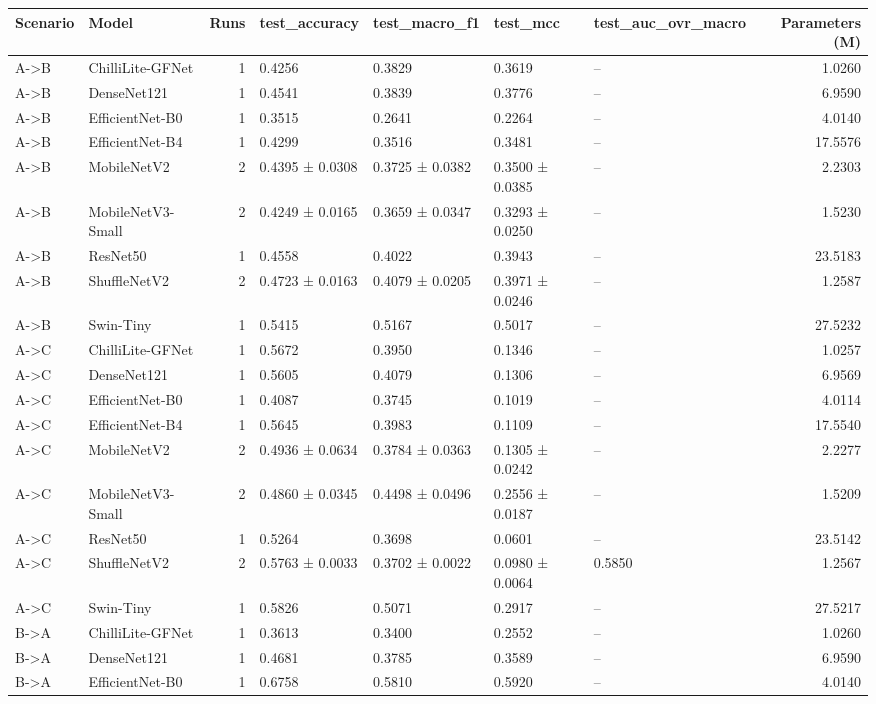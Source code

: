 \begin{tabular}{llrllllr}
\toprule
Scenario & Model & Runs & test\_accuracy & test\_macro\_f1 & test\_mcc & test\_auc\_ovr\_macro & Parameters (M) \\
\midrule
A->B & ChilliLite-GFNet & 1 & 0.4256 & 0.3829 & 0.3619 & -- & 1.0260 \\
A->B & DenseNet121 & 1 & 0.4541 & 0.3839 & 0.3776 & -- & 6.9590 \\
A->B & EfficientNet-B0 & 1 & 0.3515 & 0.2641 & 0.2264 & -- & 4.0140 \\
A->B & EfficientNet-B4 & 1 & 0.4299 & 0.3516 & 0.3481 & -- & 17.5576 \\
A->B & MobileNetV2 & 2 & 0.4395 ± 0.0308 & 0.3725 ± 0.0382 & 0.3500 ± 0.0385 & -- & 2.2303 \\
A->B & MobileNetV3-Small & 2 & 0.4249 ± 0.0165 & 0.3659 ± 0.0347 & 0.3293 ± 0.0250 & -- & 1.5230 \\
A->B & ResNet50 & 1 & 0.4558 & 0.4022 & 0.3943 & -- & 23.5183 \\
A->B & ShuffleNetV2 & 2 & 0.4723 ± 0.0163 & 0.4079 ± 0.0205 & 0.3971 ± 0.0246 & -- & 1.2587 \\
A->B & Swin-Tiny & 1 & 0.5415 & 0.5167 & 0.5017 & -- & 27.5232 \\
A->C & ChilliLite-GFNet & 1 & 0.5672 & 0.3950 & 0.1346 & -- & 1.0257 \\
A->C & DenseNet121 & 1 & 0.5605 & 0.4079 & 0.1306 & -- & 6.9569 \\
A->C & EfficientNet-B0 & 1 & 0.4087 & 0.3745 & 0.1019 & -- & 4.0114 \\
A->C & EfficientNet-B4 & 1 & 0.5645 & 0.3983 & 0.1109 & -- & 17.5540 \\
A->C & MobileNetV2 & 2 & 0.4936 ± 0.0634 & 0.3784 ± 0.0363 & 0.1305 ± 0.0242 & -- & 2.2277 \\
A->C & MobileNetV3-Small & 2 & 0.4860 ± 0.0345 & 0.4498 ± 0.0496 & 0.2556 ± 0.0187 & -- & 1.5209 \\
A->C & ResNet50 & 1 & 0.5264 & 0.3698 & 0.0601 & -- & 23.5142 \\
A->C & ShuffleNetV2 & 2 & 0.5763 ± 0.0033 & 0.3702 ± 0.0022 & 0.0980 ± 0.0064 & 0.5850 & 1.2567 \\
A->C & Swin-Tiny & 1 & 0.5826 & 0.5071 & 0.2917 & -- & 27.5217 \\
B->A & ChilliLite-GFNet & 1 & 0.3613 & 0.3400 & 0.2552 & -- & 1.0260 \\
B->A & DenseNet121 & 1 & 0.4681 & 0.3785 & 0.3589 & -- & 6.9590 \\
B->A & EfficientNet-B0 & 1 & 0.6758 & 0.5810 & 0.5920 & -- & 4.0140 \\

\end{tabular}
